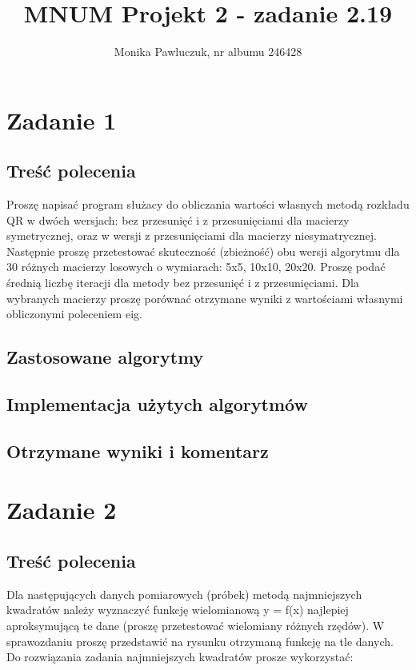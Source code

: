 \documentclass[11pt]{article} %
\title{MNUM Projekt 2 - zadanie 2.19}
\author{Monika Pawluczuk, nr albumu 246428}
\begin{document}
\maketitle

\section{Zadanie 1}

\subsection{Treść polecenia}

Proszę napisać program służacy do obliczania wartości własnych metodą rozkładu QR w dwóch wersjach: bez przesunięć i z przesunięciami dla macierzy symetrycznej, oraz w wersji z przesunięciami dla macierzy niesymatrycznej. Następnie proszę przetestować skuteczność (zbieżność) obu wersji algorytmu dla 30 różnych macierzy losowych o wymiarach: 5x5, 10x10, 20x20. Proszę podać średnią liczbę iteracji dla metody bez przesunięć i z przesunięciami. Dla wybranych macierzy proszę porównać otrzymane wyniki z wartościami własnymi obliczonymi poleceniem eig.

\subsection{Zastosowane algorytmy}

\subsection{Implementacja użytych algorytmów}

\subsection{Otrzymane wyniki i komentarz}

\section{Zadanie 2}

\subsection{Treść polecenia}

Dla następujących danych pomiarowych (próbek) metodą najmniejszych kwadratów należy wyznaczyć funkcję wielomianową y = f(x) najlepiej aproksymującą te dane (proszę przetestować wielomiany różnych rzędów). W sprawozdaniu proszę przedstawić na rysunku otrzymaną funkcję na tle danych. Do rozwiązania zadania najmniejszych kwadratów prosze wykorzystać:
\end{document}
